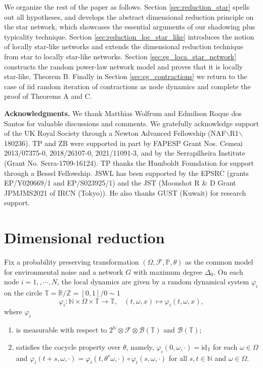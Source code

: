 \documentclass[a4paper]{article}
\theoremstyle{plain}
\theoremstyle{definition}
\newcommand{\PP}{\mathbb{P}}
\newcommand{\R}{\mathbb{R}}
\newcommand{\T}{\mathbb{T}}
\newcommand{\Z}{\mathbb{Z}}
\newcommand{\N}{\mathbb{N}}
\newcommand{\Bil}{\mathcal{B}}
\newcommand{\Fil}{\mathcal{F}}
\begin{document}
We organize the rest of the paper as follows. Section \ref{sec:reduction_star} spells out all hypotheses, and develops the abstract dimensional reduction principle on the star network, which showcases the essential arguments of our shadowing plus typicality technique. Section \ref{sec:reduction_loc_star_like} introduces the notion of locally star-like networks and extends the dimensional reduction technique from star to locally star-like networks. Section \ref{sec:eg_loca_star_network} constructs the random power-law network model and proves that it is locally star-like, Theorem B. Finally in Section \ref{sec:eg_contractions} we return to the case of iid random iteration of contractions as node dynamics and complete the proof of Theorems A and C.


\textbf{Acknowledgments.} 
We thank Matthias Wolfrum and Edmilson Roque dos Santos for valuable discussions and comments. We gratefully acknowledge support of the UK Royal Society through a Newton Advanced Fellowship  (NAF$\backslash$R1$\backslash$180236). TP and ZB were supported in part by FAPESP Grant Nos. Cemeai 2013/07375-0, 2018/26107-0, 2021/11091-3, and by the Serrapilheira Institute (Grant No. Serra-1709-16124). TP thanks the Humboldt Foundation for support through a Bessel Fellowship. JSWL has been supported by the EPSRC (grants EP/Y020669/1 and EP/S023925/1) and the JST (Moonshot R \& D Grant  JPMJMS2021 of  IRCN (Tokyo)). He also thanks GUST (Kuwait) for research support.







\section{Dimensional reduction} 


Fix a probability preserving transformation $(\Omega,\Fil,\PP, \theta)$ as the common model for environmental noise and a network $G$ with maximum degree $\Delta_0$. On each node $i=1,,\cdots,N$, the local dynamics are given by a random dynamical system $\varphi_i$ on the circle $\T=\R/\Z=[0,1]/0\sim 1$
$$\varphi_i:\N\times \Omega\times\T\to\T,~~~~(t,\omega,x)\mapsto \varphi_i(t,\omega,x),$$
where $\varphi_i$ 
\begin{enumerate}
	\item[(i)] is measurable with respect to $2^{\N}\otimes \Fil\otimes \Bil(\T)$ and $\Bil(\T)$;
	\item[(ii)] satisfies the cocycle property over $\theta$, namely,  $\varphi_i(0,\omega,\cdot)=\mathrm{id}_{\T}$ for each $\omega\in\Omega$ and $\varphi_i(t+s,\omega,\cdot)=\varphi_i(t,\theta^s\omega,\cdot)\circ\varphi_i(s,\omega,\cdot)$ for all $s,t\in\N$ and $\omega\in\Omega$.
\end{enumerate}
\end{document}
